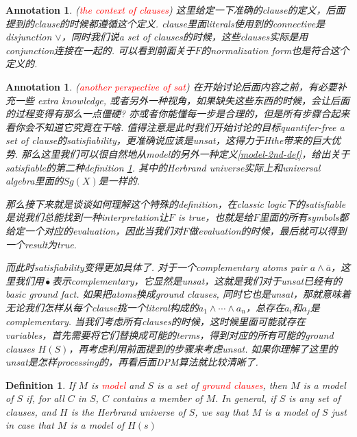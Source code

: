 \documentclass{article}
\theoremstyle{plain}
\newtheorem{definition}[theorem]{Definition}
\newtheorem{annotation}[theorem]{Annotation}
\newcounter{case}
\theoremstyle{nonumberplain}
\newcommand{\redt}[1]{\textcolor{red}{#1}}
\begin{document}
\begin{annotation}
\rm (\redt{the context of clauses}) 这里给定一下准确的clause的定义，后面提到的clause的时候都遵循这个定义. clause里面literals使用到的connective是disjunction $\vee$，同时我们说a set of clauses的时候，这些clauses实际是用conjunction连接在一起的. 可以看到前面关于$F$的normalization form也是符合这个定义的. 
\end{annotation}

\begin{annotation}
\rm (\redt{another perspective of sat}) 在开始讨论后面内容之前，有必要补充一些 extra knowledge, 或者另外一种视角，如果缺失这些东西的时候，会让后面的过程变得有那么一点僵硬? 亦或者你能懂每一步是合理的，但是所有步骤合起来看你会不知道它究竟在干啥. 值得注意是此时我们开始讨论的目标quantifer-free a set of clause的satisfiability，更准确说应该是unsat，这得力于Hthe带来的巨大优势. 那么这里我们可以很自然地从model的另外一种定义\ref{model-2nd-def}，给出关于satisfiable的第二种definition \ref{sat-2nd-def}. 其中的Herbrand universe实际上和universal algebra里面的$Sg(X)$是一样的. 

那么接下来就是谈谈如何理解这个特殊的definition，在classic logic下的satisfiable是说我们总能找到一种interpretation让$F$ is true，也就是给$F$里面的所有symbols都给定一个对应的evaluation，因此当我们对$F$做evaluation的时候，最后就可以得到一个result为true. 

而此时satisfiability变得更加具体了. 对于一个complementary atoms pair $a\wedge \overline{a}$，这里我们用$\overline{•}$表示complementary，它显然是unsat，这就是我们对于unsat已经有的basic ground fact. 如果把atoms换成ground clauses, 同时它也是unsat，那就意味着无论我们怎样从每个clause挑一个literal构成的$a_1 \wedge \cdots \wedge a_n$，总存在$a_i$和$a_j$是complementary. 当我们考虑所有clauses的时候，这时候里面可能就存在variables，首先需要将它们替换成可能的terms，得到对应的所有可能的ground clauses $H(S)$，再考虑利用前面提到的步骤来考虑unsat. 如果你理解了这里的unsat是怎样processing的，再看后面DPM算法就比较清晰了. 
\end{annotation}

\begin{definition}\label{sat-2nd-def}
\rm If $M$ is \redt{model} and $S$ is a set of \redt{ground clauses}, then $M$ is a model of $S$ if, for all $C$ in $S$, $C$ contains a member of $M$. In general, if $S$ is any set of clauses, and $H$ is the Herbrand universe of $S$, we say that $M$ is a model of $S$ just in case that $M$ is a model of $H(s)$
\end{definition}
\end{document}
